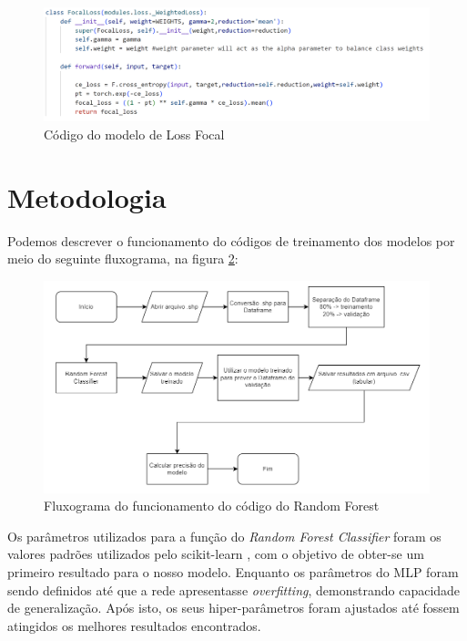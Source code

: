 \begin{figure}[ht]
    \centering
    \includegraphics[scale=0.5]{tg1/figuras/loss.png}
    \caption{Código do modelo de Loss Focal}
    \label{fig:loss}
\end{figure}

\section{Metodologia}



Podemos descrever o funcionamento do códigos de treinamento dos modelos por meio do seguinte fluxograma, na figura \ref{fig:rfflux}:

\begin{figure}[H]
	\centering
	\begin{minipage}{0.98\linewidth}
		\centering
		\includegraphics[width=\linewidth]{tg1/figuras/rfflux.png}
		\caption{Fluxograma do funcionamento do código do Random Forest} \label{fig:rfflux}
	\end{minipage}
\end{figure}
Os parâmetros utilizados para a função do \textit{Random Forest Classifier} foram os valores padrões utilizados pelo scikit-learn \cite{sklearnrfc}, com o objetivo de obter-se um primeiro resultado para o nosso modelo. Enquanto os parâmetros do MLP foram sendo definidos até que a rede apresentasse \textit{overfitting}, demonstrando capacidade de generalização. Após isto, os seus hiper-parâmetros foram ajustados até fossem atingidos os melhores resultados encontrados.


